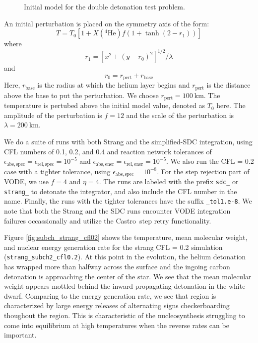\documentclass[times,preprint]{aastex631}
\newcommand{\castro}{{\sf Castro}}
\newcommand{\isotm}[2]{{}^{#2}\mathrm{#1}}
\newcommand{\atolspec}{{\epsilon_\mathrm{abs,spec}}}
\newcommand{\rtolspec}{{\epsilon_\mathrm{rel,spec}}}
\newcommand{\atolener}{{\epsilon_\mathrm{abs,ener}}}
\newcommand{\rtolener}{{\epsilon_\mathrm{rel,ener}}}
\begin{document}
\begin{figure}[t]
\centering
{}
\caption{\label{fig:subch_initial_model} Initial model for the double detonation test problem.}
\end{figure}

An initial perturbation is placed on the symmetry axis of the form:
\begin{equation}
  T = T_0 \left [ 1 + X(\isotm{He}{4}) f (1 + \tanh(2 - r_1)) \right ]
\end{equation}
where
\begin{equation}
  r_1 = \left [ x^2 + (y - r_0)^2 \right ]^{1/2} / \lambda
\end{equation}
and
\begin{equation}
  r_0 = r_\mathrm{pert} + r_\mathrm{base}
\end{equation}
Here, $r_\mathrm{base}$ is the radius at which the helium layer begins
and $r_\mathrm{pert}$ is the distance above the base to put the perturbation.  We
choose $r_\mathrm{pert} = 100~\mathrm{km}$.  The temperature is pertubed above
the initial model value, denoted as $T_0$ here.  The amplitude of the perturbation
is $f = 12$ and the scale of the perturbation is $\lambda = 200~\mathrm{km}$.


We do a suite of runs with both Strang and the simplified-SDC integration, using
CFL numbers of 0.1, 0.2, and 0.4 and reaction network tolerances of $\atolspec =
\rtolspec = 10^{-5}$ and $\atolener = \rtolener = 10^{-5}$.  We also run the CFL
= 0.2 case with a tighter tolerance, using  $\atolspec = 10^{-8}$.  For the step
rejection part of VODE, we use $f = 4$ and $\eta = 4$.  The runs are labeled with
the prefix {\tt sdc\_} or {\tt strang\_} to detonate the integrator, and also include
the CFL number in the name.  Finally, the runs with the tighter tolerances have
the suffix {\tt \_tol1.e-8}.  We note that both the Strang and the SDC runs encounter
VODE integration failures occassionally and utilize the \castro\ step retry functionality.

Figure \ref{fig:subch_strang_cfl02} shows the temperature, mean
molecular weight, and nuclear energy generation rate for the strang
CFL = 0.2 simulation ({\tt strang\_subch2\_cfl0.2}).  At this point
in the evolution, the helium detonation has wrapped more than halfway
across the surface and the ingoing carbon detonation is approaching the
center of the star.  We see that the
mean molecular weight appears mottled behind the inward propagating
detonation in the white dwarf.  Comparing to the energy generation
rate, we see that region is characterized by large energy releases of
alternating signs checkerboarding thoughout the region.  This is
characteristic of the nucleosynthesis struggling to come into
equilibrium at high temperatures when the reverse rates can be
important.
\end{document}
